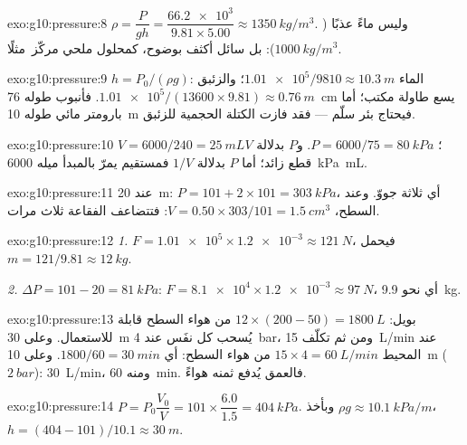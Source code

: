 \begin{solution}{exo:g10:pressure:8}
$\rho = \dfrac{P}{g h} = \dfrac{\num{66.2e3}}{9.81 \times 5.00}
\approx \qty{1350}{kg/m^3}$. وليس ماءً عذبًا ($\qty{1000}{kg/m^3}$):
بل سائل أكثف بوضوح، كمحلول ملحي مركّز\ مثلًا.
\end{solution}

\begin{solution}{exo:g10:pressure:9}
$h = P_0/(\rho g)$: الماء
$\num{1.01e5}/9810 \approx \qty{10.3}{m}$؛ والزئبق
$\num{1.01e5}/(13600 \times 9.81) \approx \qty{0.76}{m}$. فأنبوب طوله
\qty{76}{cm} يسع طاولة مكتب؛ أما بارومتر مائي طوله \qty{10}{m} فيحتاج
بئر سلّم --- فقد فازت الكتلة الحجمية للزئبق.
\end{solution}

\begin{solution}{exo:g10:pressure:10}
$V = 6000/240 = \qty{25}{mL}$؛ $P = 6000/75 = \qty{80}{kPa}$.
و$P$ بدلالة $V$ قطع زائد؛ أما $P$ بدلالة $1/V$ فمستقيم
يمرّ بالمبدأ ميله \qty{6000}{kPa.mL}.
\end{solution}

\begin{solution}{exo:g10:pressure:11}
عند \qty{20}{m}: $P = 101 + 2 \times 101 = \qty{303}{kPa}$، أي ثلاثة
جووّ. وعند السطح،
$V = 0.50 \times 303/101 = \qty{1.5}{cm^3}$: فتتضاعف الفقاعة ثلاث مرات.
\end{solution}

\begin{solution}{exo:g10:pressure:12}
\emph{1.} $F = \num{1.01e5} \times \num{1.2e-3} \approx \qty{121}{N}$،
فيحمل $m = 121/9.81 \approx \qty{12}{kg}$.

\emph{2.} $\Delta P = 101 - 20 = \qty{81}{kPa}$:
$F = \num{8.1e4} \times \num{1.2e-3} \approx \qty{97}{N}$، أي نحو
\qty{9.9}{kg}.
\end{solution}

\begin{solution}{exo:g10:pressure:13}
بويل: $12 \times (200 - 50) = \qty{1800}{L}$ من هواء  السطح
قابلة للاستعمال. وعلى \qty{30}{m} يُسحب كل نفَس عند \qty{4}{bar}، ومن ثم تكلّف
\qty{15}{L/min} عند  المحيط
$15 \times 4 = \qty{60}{L/min}$ من هواء السطح: أي $1800/60 =
\qty{30}{min}$. وعلى \qty{10}{m} ($\qty{2}{bar}$): \qty{30}{L/min}،
ومنه \qty{60}{min}. فالعمق يُدفع ثمنه هواءً.
\end{solution}

\begin{solution}{exo:g10:pressure:14}
$P = P_0 \dfrac{V_0}{V} = 101 \times \dfrac{6.0}{1.5} =
\qty{404}{kPa}$. وبأخذ $\rho g \approx \qty{10.1}{kPa/m}$،
$h = (404 - 101)/10.1 \approx \qty{30}{m}$.
\end{solution}

